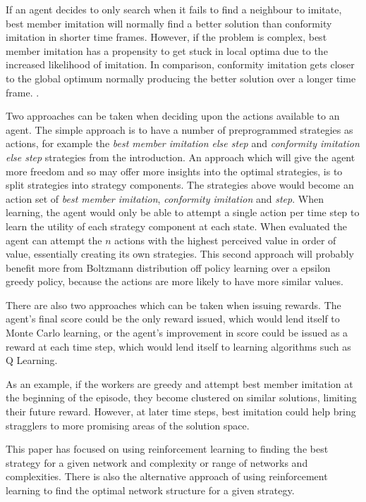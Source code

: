 \documentclass[conference]{IEEEtran}
\begin{document}
If an agent decides to only search when it fails to find a neighbour to imitate,
best member imitation will normally find a better solution than
conformity imitation in shorter time frames.
However, if the problem is complex,
best member imitation has a propensity to get stuck in local optima
due to the increased likelihood of imitation.
In comparison, conformity imitation gets closer to the global optimum
normally producing the better solution over a longer time frame.
\cite{sociallearning}.



Two approaches can be taken when deciding upon
the actions available to an agent.
The simple approach is to have a number of preprogrammed strategies as actions,
for example the \emph{best member imitation else step}
and \emph{conformity imitation else step} strategies from the introduction.
An approach which will give the agent more freedom
and so may offer more insights into the optimal strategies,
is to split strategies into strategy components.
The strategies above would become an action set of
\emph{best member imitation}, \emph{conformity imitation} and \emph{step}.
When learning,
the agent would only be able to attempt a single action per time step
to learn the utility of each strategy component at each state.
When evaluated the agent can attempt the $n$ actions
with the highest perceived value in order of value,
essentially creating its own strategies.
This second approach will probably benefit more from Boltzmann distribution
off policy learning over a epsilon greedy policy,
because the actions are more likely to have more similar values.


There are also two approaches which can be taken when issuing rewards.
The agent's final score could be the only reward issued,
which would lend itself to Monte Carlo learning,
or the agent's improvement in score could be issued as a reward
at each time step,
which would lend itself to learning algorithms such as Q Learning.

As an example, if the workers are greedy and attempt best member imitation
at the beginning of the episode, they become clustered on similar solutions,
limiting their future reward.
However, at later time steps, best imitation could help bring stragglers
to more promising areas of the solution space.

This paper has focused on using reinforcement learning
to finding the best strategy
for a given network and complexity or range of networks and complexities.
There is also the alternative approach of using reinforcement learning to
find the optimal network structure for a given strategy.
\end{document}
